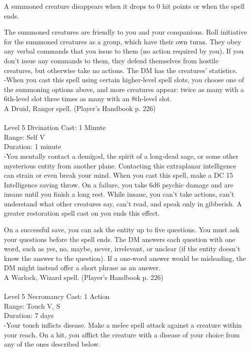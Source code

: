 \documentclass[10pt,twocolumn]{report}
\begin{document}
A summoned creature disappears when it drops to 0 hit points or when the spell ends. 

The summoned creatures are friendly to you and your companions. Roll initiative for the summoned creatures as a group, which have their own turns. They obey any verbal commands that you issue to them (no action required by you). If you don’t issue any commands to them, they defend themselves from hostile creatures, but otherwise take no actions. 
The DM has the creatures’ statistics.\\
-When you cast this spell using certain higher-level spell slots, you choose one of the summoning options above, and more creatures appear: 
twice as many with a 6th-level slot
three times as many with an 8th-level slot.\\
A Druid, Ranger spell. (Player's Handbook p. 226) \\


 \\
Level 5 \quad Divination \quad Cast: 1 Minute\\
Range: Self \quad V\\
Duration: 1 minute \quad \\
-You mentally contact a demigod, the spirit of a long-dead sage, or some other mysterious entity from another plane. 
Contacting this extraplanar intelligence can strain or even break your mind. When you cast this spell, make a DC 15 Intelligence saving throw. On a failure, you take 6d6 psychic damage and are insane until you finish a long rest. While insane, you can’t take actions, can’t understand what other creatures say, can’t read, and speak only in gibberish. A greater restoration spell cast on you ends this effect. 

On a successful save, you can ask the entity up to five questions. You must ask your questions before the spell ends. The DM answers each question with one word, such as yes, no, maybe, never, irrelevant, or unclear (if the entity doesn’t know the answer to the question). If a one-word answer would be misleading, the DM might instead offer a short phrase as an answer.\\
A Warlock, Wizard spell. (Player's Handbook p. 226) \\


 \\
Level 5 \quad Necromancy \quad Cast: 1 Action\\
Range: Touch \quad V, S\\
Duration: 7 days \quad \\
-Your touch inflicts disease. 
Make a melee spell attack against a creature within your reach. On a hit, you afflict the creature with a disease of your choice from any of the ones described below. 
\end{document}
